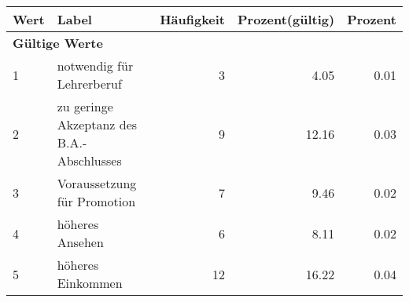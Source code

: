      \begin{longtable}{lXrrr}
     \toprule
     \textbf{Wert} & \textbf{Label} & \textbf{Häufigkeit} & \textbf{Prozent(gültig)} & \textbf{Prozent} \\
     \endhead
     \midrule
     \multicolumn{5}{l}{\textbf{Gültige Werte}}\\

     1 &
     \multicolumn{1}{X}{ notwendig für Lehrerberuf   } &


       \num{3} &
       \num[round-mode=places,round-precision=2]{4.05} &
         \num[round-mode=places,round-precision=2]{0.01} \\

     2 &
     \multicolumn{1}{X}{ zu geringe Akzeptanz des B.A.-Abschlusses   } &


       \num{9} &
       \num[round-mode=places,round-precision=2]{12.16} &
         \num[round-mode=places,round-precision=2]{0.03} \\

     3 &
     \multicolumn{1}{X}{ Voraussetzung für Promotion   } &


       \num{7} &
       \num[round-mode=places,round-precision=2]{9.46} &
         \num[round-mode=places,round-precision=2]{0.02} \\

     4 &
     \multicolumn{1}{X}{ höheres Ansehen   } &


       \num{6} &
       \num[round-mode=places,round-precision=2]{8.11} &
         \num[round-mode=places,round-precision=2]{0.02} \\

     5 &
     \multicolumn{1}{X}{ höheres Einkommen   } &


       \num{12} &
       \num[round-mode=places,round-precision=2]{16.22} &
         \num[round-mode=places,round-precision=2]{0.04} \\


\end{longtable}
